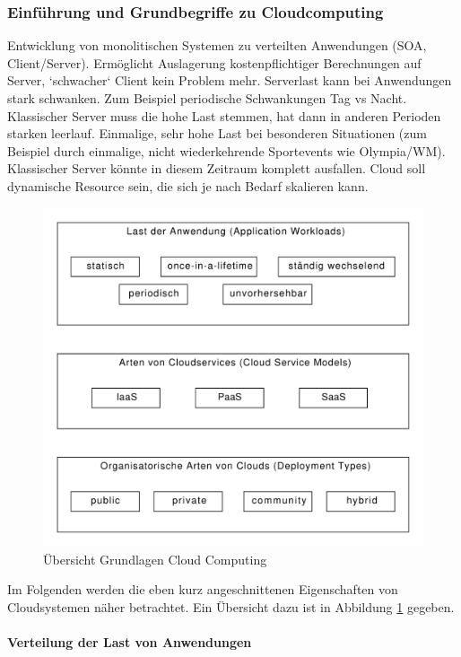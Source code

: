 \documentclass[a4paper,10pt]{article}
\begin{document}
\subsubsection{Einführung und Grundbegriffe zu Cloudcomputing}

Entwicklung von monolitischen Systemen zu verteilten Anwendungen (SOA, Client/Server).
Ermöglicht Auslagerung kostenpflichtiger Berechnungen auf Server, `schwacher` Client kein Problem mehr.
Serverlast kann bei Anwendungen stark schwanken.
Zum Beispiel periodische Schwankungen Tag vs Nacht.
Klassischer Server muss die hohe Last stemmen, hat dann in anderen Perioden starken leerlauf.
Einmalige, sehr hohe Last bei besonderen Situationen (zum Beispiel durch einmalige, nicht wiederkehrende Sportevents wie Olympia/WM).
Klassischer Server könnte in diesem Zeitraum komplett ausfallen.
Cloud soll dynamische Resource sein, die sich je nach Bedarf skalieren kann.

\begin{figure}[htbp]
\centering
\caption{Übersicht Grundlagen Cloud Computing}
\label{fig:cloudComputingOverview}
\includegraphics[width=\textwidth]{graphics/cloudComputingOverview.pdf}
\end{figure}

Im Folgenden werden die eben kurz angeschnittenen Eigenschaften von Cloudsystemen näher betrachtet.
Ein Übersicht dazu ist in Abbildung \ref{fig:cloudComputingOverview} gegeben.

\paragraph{Verteilung der Last von Anwendungen}
\end{document}
